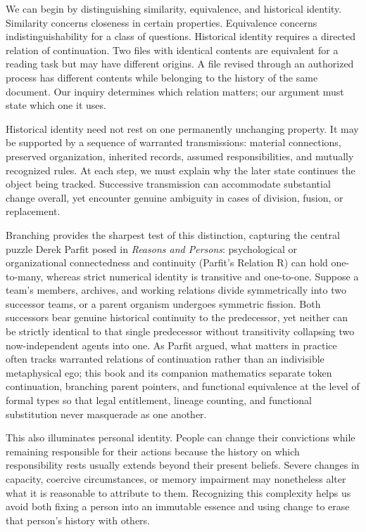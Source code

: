 \documentclass[
  english,
  11pt,
  oneside]{book}
\newcounter{none} %
\begin{document}
We can begin by distinguishing similarity, equivalence, and historical identity. Similarity concerns closeness in certain properties. Equivalence concerns indistinguishability for a class of questions. Historical identity requires a directed relation of continuation. Two files with identical contents are equivalent for a reading task but may have different origins. A file revised through an authorized process has different contents while belonging to the history of the same document. Our inquiry determines which relation matters; our argument must state which one it uses.

Historical identity need not rest on one permanently unchanging property. It may be supported by a sequence of warranted transmissions: material connections, preserved organization, inherited records, assumed responsibilities, and mutually recognized rules. At each step, we must explain why the later state continues the object being tracked. Successive transmission can accommodate substantial change overall, yet encounter genuine ambiguity in cases of division, fusion, or replacement.

Branching provides the sharpest test of this distinction, capturing the central puzzle Derek Parfit posed in \emph{Reasons and Persons}: psychological or organizational connectedness and continuity (Parfit's Relation R) can hold one-to-many, whereas strict numerical identity is transitive and one-to-one. Suppose a team's members, archives, and working relations divide symmetrically into two successor teams, or a parent organism undergoes symmetric fission. Both successors bear genuine historical continuity to the predecessor, yet neither can be strictly identical to that single predecessor without transitivity collapsing two now-independent agents into one. As Parfit argued, what matters in practice often tracks warranted relations of continuation rather than an indivisible metaphysical ego; this book and its companion mathematics separate token continuation, branching parent pointers, and functional equivalence at the level of formal types so that legal entitlement, lineage counting, and functional substitution never masquerade as one another.

This also illuminates personal identity. People can change their convictions while remaining responsible for their actions because the history on which responsibility rests usually extends beyond their present beliefs. Severe changes in capacity, coercive circumstances, or memory impairment may nonetheless alter what it is reasonable to attribute to them. Recognizing this complexity helps us avoid both fixing a person into an immutable essence and using change to erase that person's history with others.
\end{document}
